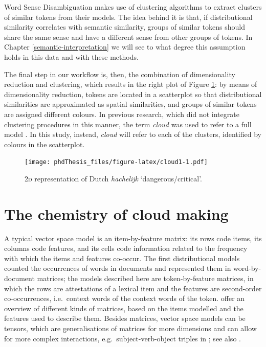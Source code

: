 \documentclass[
]{book}
\begin{document}
Word Sense Disambiguation
makes use of clustering algorithms to extract clusters of similar tokens from their models. The idea behind it is that, if distributional similarity correlates with semantic similarity, groups of similar tokens should share the same sense and have a different sense from other groups of tokens. In Chapter \ref{semantic-interpretation} we will see to what degree this assumption holds in this data and with these methods.

The final step in our workflow is, then, the combination of dimensionality reduction and clustering, which results in the right plot of Figure \ref{fig:cloud1}: by means of dimensionality reduction, tokens are located in a scatterplot so that distributional similarities are approximated as spatial similarities, and groups of similar tokens are assigned different colours.
In previous research, which did not integrate clustering procedures in this manner, the term \emph{cloud} was used to refer to a full model \autocite{heylen.etal_2015,wielfaert.etal_2019,depascale_2019,montes.heylen_Submitted}. In this study, instead, \emph{cloud} will refer to each of the clusters, identified by colours in the scatterplot.



\begin{figure}
\centering
\texttt{[image: phdThesis\_files/figure-latex/cloud1-1.pdf]}
\caption{\label{fig:cloud1}\textsc{2d} representation of Dutch \emph{hachelijk} `dangerous/critical'.}
\end{figure}

\hypertarget{formulae}{%
\section{The chemistry of cloud making}\label{formulae}}

A typical vector space model is an item-by-feature matrix: its rows code items, its columns code features, and its cells code information related to the frequency with which the items and features co-occur. The first distributional models counted the occurrences of words in documents and represented them in word-by-document matrices; the models described here are token-by-feature matrices, in which the rows are attestations of a lexical item and the features are second-order co-occurrences, i.e.~context words of the context words of the token. \textcite{turney.pantel_2010} offer an overview of different kinds of matrices, based on the items modelled and the features used to describe them.
Besides matrices, vector space models can be tensors, which are generalisations of matrices for more dimensions and can allow for more complex interactions, e.g.~subject-verb-object triples in \textcite{vandecruys.etal_2013}; see also \textcite{lenci_2018}.
\end{document}
